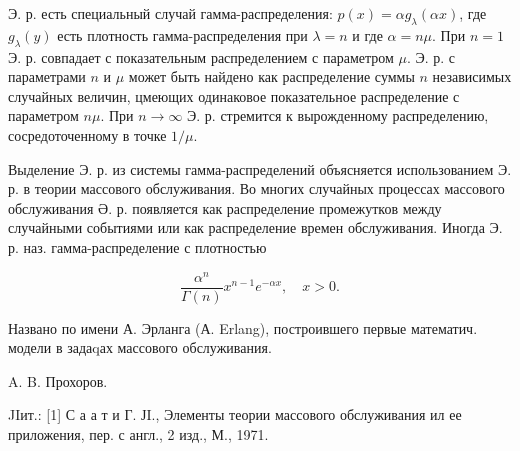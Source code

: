 \documentclass[10pt]{article}
\begin{document}
Э. р. есть специальный случай гамма-распределения: $p(x)=\alpha g_{\lambda}(\alpha x)$, где $g_{\lambda}(y)$ есть плотность гамма-распределения при $\lambda=n$ и где $\alpha=n \mu$. При $n=1$ Э. р. совпадает с показательным распределением с параметром $\mu$. Э. р. с параметрами $n$ и $\mu$ может быть найдено как распределение суммы $n$ независимых случайных величин, цмеющих одинаковое показательное распределение с параметром $n \mu$. При $n \rightarrow \infty$ Э. р. стремится к вырожденному распределению, сосредоточенному в точке $1 / \mu$.



Выделение Э. р. из системы гамма-распределений объясняется использованием Э. р. в теории массового обслуживания. Во многих случайных процессах массового обслуживания Ә. р. появляется как распределение промежутков между случайными событиями или как распределение времен обслуживания. Иногда Э. р. наз. гамма-распределение с плотностью



\[

\frac{\alpha^{n}}{\Gamma(n)} x^{n-1} e^{-\alpha x}, \quad x>0 .

\]



Названо по имени А. Эрланга (А. Erlang), построившего первые математич. модели в задаqах массового обслуживания.



A. B. Прохоров.



JIит.: [1] С а а т и Г. ЈI., Элементы теории массового обслуживания ил ее приложения, пер. с англ., 2 изд., М., 1971.
\end{document}

